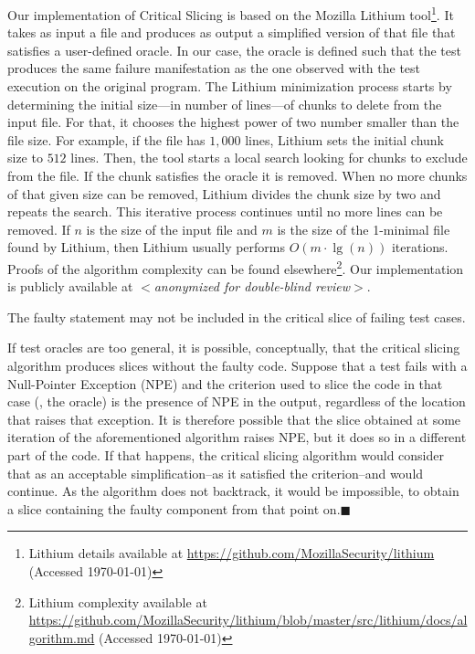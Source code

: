 \documentclass{article}
\begin{document}
Our implementation of Critical Slicing is based on the Mozilla Lithium
tool\footnote{Lithium details available at {\footnotesize\url{https://github.com/MozillaSecurity/lithium}} (Accessed \today)}. It takes as input a file
and produces as output a simplified version of that file that
satisfies a user-defined oracle. In our case, the oracle is defined
such that the test produces the same failure manifestation as the one
observed with the test execution on the original program. The
Lithium minimization process starts by determining the initial size---in
number of lines---of chunks to delete from the input file. For that,
it chooses the highest power of two number smaller than the file
size. For example, if the file has $1,000$ lines, Lithium sets the
initial chunk size to $512$ lines. Then, the tool starts a local search looking
for chunks to exclude from the file. If the chunk satisfies the oracle it is removed.
When no more chunks of that given size can be removed, Lithium
divides the chunk size by two and repeats the search. This iterative
process continues until no more lines can be removed.  If $n$ is the
size of the input file and $m$ is the size of the 1-minimal file found
by Lithium, then Lithium usually performs $O(m\cdot\lg(n))$
iterations. Proofs of the algorithm complexity can be found
elsewhere\footnote{Lithium complexity available at \url{https://github.com/MozillaSecurity/lithium/blob/master/src/lithium/docs/algorithm.md} (Accessed \today)}. Our implementation is publicly
available at \textit{$<$anonymized for double-blind review$>$}.

\begin{theorem}\label{the:1}
  The faulty statement may not be included in the critical slice of
  failing test cases.
\end{theorem}

If test oracles are too general, it is possible, conceptually, that
the critical slicing algorithm produces slices without the faulty
code. Suppose that a test fails with a Null-Pointer Exception (NPE)
and the criterion used to slice the code in that case (\ie{}, the
oracle) is the presence of NPE in the output, regardless of the
location that raises that exception. It is therefore possible that the
slice obtained at some iteration of the aforementioned algorithm
raises NPE, but it does so in a different part of the code. If that
happens, the critical slicing algorithm would consider that as an
acceptable simplification--as it satisfied the criterion--and would
continue. As the algorithm does not backtrack, it would be impossible,
to obtain a slice containing the faulty component from that point
on.\hfill{\tiny$\blacksquare$}
\end{document}
